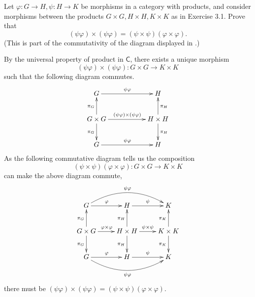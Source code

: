 \documentclass[12pt,letterpaper,boxed]{hmcpset}
\begin{document}
\begin{problem}[3.2]	
	Let $\varphi : G\rightarrow H, \psi : H \rightarrow K$ be morphisms in a category with products, and
	consider morphisms between the products $G\times G, H\times H, K\times K$ as in Exercise 3.1.
	Prove that
	\[
	(\psi\varphi) \times(\psi\varphi)=(\psi \times \psi)(\varphi\times \varphi) .
	\]
	(This is part of the commutativity of the diagram displayed in .)
\end{problem}
\begin{solution}
	By the universal property of product in $\mathsf{C}$, there exists a unique morphism 
	\[
	(\psi\varphi) \times(\psi\varphi):G\times G\rightarrow K\times K
	\] 
	such that the following diagram commutes.
	\[\xymatrix{
		G\ar[rr]^{\psi\varphi} && H \\
		G \times G\ar[u]^{\pi_G}\ar[d]_{\pi_G}\ar[rr]^{	(\psi\varphi) \times(\psi\varphi)} &&  H\times H\ar[u]_{\pi_H}\ar[d]^{\pi_H} \\
		G\ar[rr]^{\psi\varphi} && H 
	}\]
    As the following commutative diagram tells us the composition 
    \[
    (\psi \times \psi)(\varphi\times \varphi):G\times G\rightarrow K\times K
    \]
    can make the above diagram commute,
	\[\xymatrix{
		G\ar[r]^{\varphi}\ar@/^1.6pc/[rr]^{\psi\varphi} & H\ar[r]^{\psi} & K \\
		G \times G\ar[u]^{\pi_G}\ar[d]_{\pi_G}\ar[r]^{\varphi\times\varphi} &  H\times H\ar[u]^{\pi_H}\ar[d]_{\pi_H}\ar[r]^{\psi\times\psi} &  K\times K \ar[u]^{\pi_K}\ar[d]_{\pi_K}\\
		G\ar[r]^{\varphi}\ar@/_1.6pc/[rr]_{\psi\varphi} & H \ar[r]^{\psi} & K
	}\]
    there must be $(\psi\varphi) \times(\psi\varphi)=(\psi \times \psi)(\varphi\times \varphi)$.
    
\end{solution}
\end{document}
